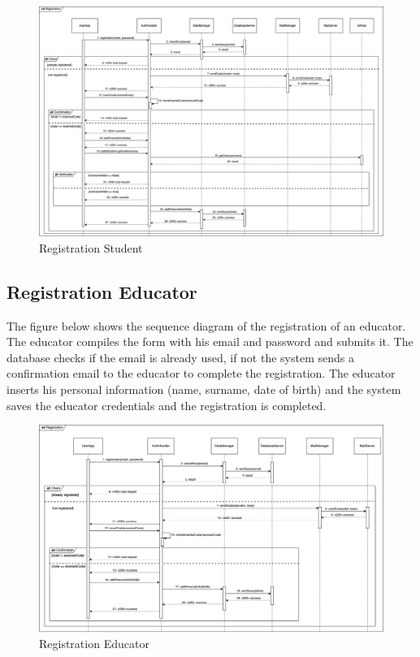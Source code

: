 \begin{figure}[H]
    \centering
    \includegraphics[width=1\textwidth]{images/seq_diagrams/RegistrationStd_DD.png}
    \caption{Registration Student}
\end{figure}
\clearpage

\subsection{Registration Educator}
The figure below shows the sequence diagram of the registration of an educator. The educator compiles the form with his email and password and submits it. 
The database checks if the email is already used, if not the system sends a confirmation email to the educator to complete the registration. 
The educator inserts his personal information (name, surname, date of birth) and the system saves the educator credentials and the registration is completed.
\begin{figure}[H]
    \centering
    \includegraphics[width=1\textwidth]{images/seq_diagrams/RegistrationEd_DD.png}
    \caption{Registration Educator}
\end{figure}
\clearpage

